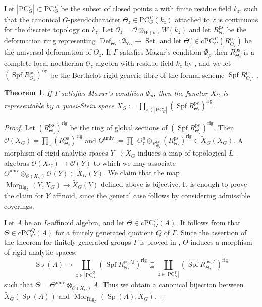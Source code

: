 \documentclass{amsart}
\newtheorem{thm}[prop]{Theorem}
\theoremstyle{definition}
\theoremstyle{remark}
\DeclareMathOperator{\Mor}{Mor}
\DeclareMathOperator{\Sp}{Sp}
\DeclareMathOperator{\Def}{Def}
\DeclareMathOperator{\Set}{Set}
\newcommand{\Aa}{\mathfrak A}
\newcommand{\OO}{\mathcal O}
\DeclareMathOperator{\Spf}{Spf}
\newcommand{\rig}{\mathrm{rig}}
\newcommand{\univ}{\mathrm{univ}}
\newcommand{\PC}{\mathrm{PC}}
\newcommand{\cPC}{\mathrm{cPC}}
\newcommand{\ps}{\mathrm{ps}}
\newcommand{\Rig}{\mathrm{Rig}}
\begin{document}
Let $|\PC^{\Gamma}_G|\subset \PC^{\Gamma}_G$ be the subset of closed points $z$ with finite residue field $k_z$, such that the canonical $G$-pseudocharacter 
$\Theta_z\in \PC^{\Gamma}_G(k_z)$ attached to $z$ is continuous for the discrete topology on $k_z$. Let $\OO_z= \OO\otimes_{W(k)} W(k_z)$ and 
let $R^{\ps}_{\Theta_z}$ be the deformation ring representing 
$\Def_{\Theta_z}: \Aa_{\OO_z}\rightarrow \Set$ and let $\Theta^u_z\in \cPC^{\Gamma}_G(R^{\ps}_{\Theta_z})$ be the universal deformation of $\Theta_z$.
If $\Gamma$ satisfies Mazur's condition $\Phi_p$ then 
$R^{\ps}_{\Theta_z}$ is a complete local noetherian $\OO_z$-algebra 
with residue field $k_z$ by , and we let $(\Spf R^{\ps}_{\Theta_z})^{\rig}$
be the Berthelot rigid generic fibre of the formal scheme $\Spf R^{\ps}_{\Theta_z}$, 
\cite[Section 7]{deJong}.

\begin{thm}\label{main_rigid} If $\Gamma$ satisfies Mazur's  condition $\Phi_p$, then 
the functor $\tilde{X}_G$ is representable by a quasi-Stein space
$ X_G:=\coprod_{z\in |\PC^{\Gamma}_G|} (\Spf R^{\ps}_{\Theta_z})^{\rig}$.
\end{thm} 
\begin{proof} Let $(R^{\ps}_{\Theta_z})^{\rig}$ be the ring of global sections
of $(\Spf R^{\ps}_{\Theta_z})^{\rig}$. Then $\OO(X_G)=\prod_z (R^{\ps}_{\Theta_z})^{\rig}$ and $\Theta^{\univ}:= \prod_z \Theta^u_z\otimes_{R^{\ps}_{\Theta_z}} (R^{\ps}_{\Theta_z})^{\rig} \in 
\tilde{X}_G(X_G)$. A morphism of rigid analytic spaces $Y\rightarrow X_G$ induces 
a map of topological $L$-algebras $\OO(X_G) \rightarrow \OO(Y)$ to which 
we may associate $\Theta^{\univ}\otimes_{\OO(X_G)} \OO(Y)\in \tilde{X}_G(Y)$.
We claim that the map $\Mor_{\Rig_L}(Y, X_G)\rightarrow \tilde{X}_G(Y)$ defined above is 
bijective. It is enough to prove the claim for $Y$ affinoid, since the 
general case follows by considering admissible coverings. 

Let $A$ be an $L$-affinoid algebra, 
and let $\Theta\in \cPC^{\Gamma}_G(A)$. It follows from 
 that $\Theta\in \cPC^{Q}_G(A)$ for a finitely generated 
quotient $Q$ of $\Gamma$. Since the assertion of the theorem for finitely 
generated groups $\Gamma$ is proved in \cite[Theorem 6.1]{quast}, $\Theta$ 
induces a morphism of rigid analytic spaces:
\begin{equation} 
\Sp(A) \rightarrow \coprod_{z\in |\PC^{Q}_G|} (\Spf R^{\ps, Q}_{\Theta_z})^{\rig}
\subseteq \coprod_{z\in |\PC^{\Gamma}_G|} (\Spf R^{\ps, \Gamma}_{\Theta_z})^{\rig}
\end{equation}
such that $\Theta= \Theta^{\univ}\otimes_{\OO(X_G)} A$. Thus we 
obtain a canonical bijection between $\tilde{X}_G(\Sp(A))$ and 
$\Mor_{\Rig_L}(\Sp(A), X_G)$.  
\end{proof} 
\end{document}
